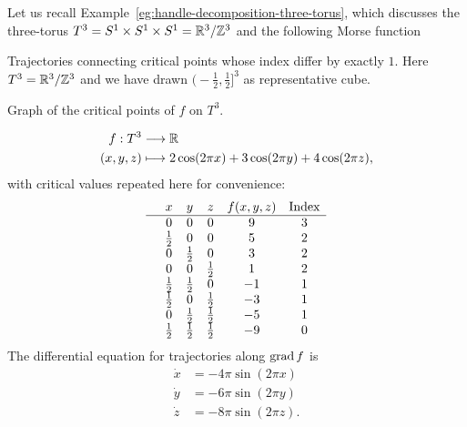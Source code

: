 \begin{eg}
    \label{eg:homology-of-the-three-torus}
    Let us recall Example~\ref{eg:handle-decomposition-three-torus}, which discusses the three-torus $T^{3} = S^{1} \times S^{1} \times S^{1} = \mathbb{R}^3 / \mathbb{Z}^3$ and the following Morse function
    \begin{marginfigure}
        \centering
        \caption{
        Trajectories connecting critical points whose index differ by exactly $1$.
        Here $T^{3} = \mathbb{R}^{3} / \mathbb{Z}^{3}$ and we have drawn $\big(-\frac{1}{2}, \frac{1}{2}\big]^3$ as representative cube.  }
        \label{fig:morse-homology-three-torus-trajectories}
    \end{marginfigure}
    \begin{marginfigure}
        \centering
        \caption{Graph of the critical points of $f$ on $T^{3}$.}
        \label{fig:mores-homology-three-torus-critical-points-graph}
    \end{marginfigure}
    \begin{align*}
        f: T^3 &\longrightarrow \mathbb{R} \\
        (x,y,z) &\longmapsto 2 \cos(2 \pi x)+ 3 \cos(2 \pi y) + 4 \cos (2 \pi z),
    \end{align*}
    with critical values repeated here for convenience:
    \[\begin{array}{cccccc}
  & x & y  & z & f(x, y, z) & \text{Index}\\ \hline
  & 0 & 0 & 0 & 9 & 3 \\
& \frac{1}{2} & 0 & 0 & 5 & 2 \\
& 0 & \frac{1}{2} & 0 & 3 & 2 \\
& 0 & 0 & \frac{1}{2} & 1 & 2 \\
& \frac{1}{2} & \frac{1}{2} & 0 & -1 & 1 \\
& \frac{1}{2} & 0 & \frac{1}{2} & -3 & 1 \\
& 0 & \frac{1}{2} & \frac{1}{2} & -5 & 1 \\
& \frac{1}{2} & \frac{1}{2} & \frac{1}{2} & -9 & 0 \\
    \end{array}\]
    The differential equation for trajectories along $\operatorname{grad} f$ is 
    \begin{align*}
        \dot x &= -4 \pi \sin(2 \pi x)\\
        \dot y &= -6 \pi \sin(2 \pi y)\\
        \dot z &= -8 \pi \sin(2 \pi z)
    .\end{align*} 



\end{eg}
